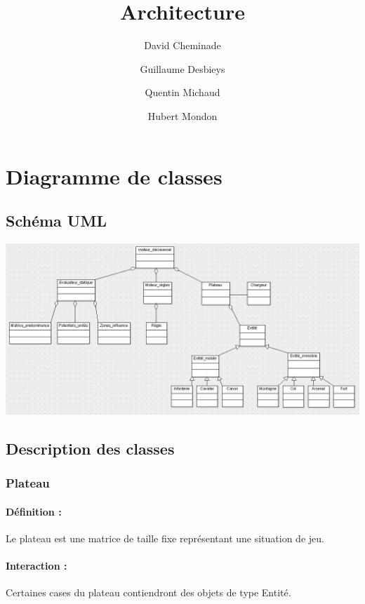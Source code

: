 \documentclass[12pt]{article}
\title{Architecture}
\author{
	David Cheminade
	\and
	Guillaume Desbieys
	\and
	Quentin Michaud
	\and
	Hubert Mondon
}
\date{}
\begin{document}
 
	\maketitle{}                             

	\section{Diagramme de classes}    

		\subsection{Schéma UML}

			\includegraphics[scale=0.4]{images/diag_classes.jpg}

		\subsection{Description des classes}

			\subsubsection{Plateau}
			
				\paragraph{Définition :}

				Le plateau est une matrice de taille fixe représentant une situation de jeu.

				\paragraph{Interaction :}

				Certaines cases du plateau contiendront des objets de type Entité.
				
\end{document}
